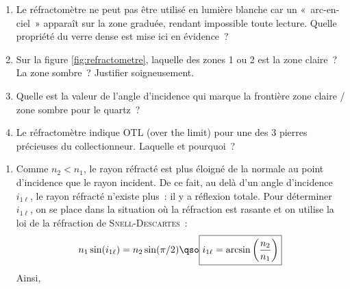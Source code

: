 \documentclass[a4paper, 10pt, garamond, oneside]{book}
\begin{document}
{	\begin{enumerate}
		\item Le réfractomètre ne peut pas être utilisé en lumière blanche car un
		      «~arc-en-ciel~» apparaît sur la zone graduée, rendant impossible toute
		      lecture. Quelle propriété du verre dense est mise ici en évidence~?
		\item Sur la figure \ref{fig:refractometre}, laquelle des zones 1 ou  2 est
		      la zone claire~? La zone sombre~? Justifier soigneusement.
		\item Quelle est la valeur de l'angle d'incidence qui marque la frontière
		      zone claire / zone sombre pour le quartz~?
		\item Le réfractomètre indique OTL (over the limit) pour une des 3 pierres
		      précieuses du collectionneur. Laquelle et pourquoi~?
	\end{enumerate}
}{
	\begin{enumerate}
		\item Comme $n_2<n_1$, le rayon réfracté est plus éloigné de la normale au
		      point d'incidence que le rayon incident. De ce fait, au delà d'un
		      angle d'incidence $i_{1\ell}$, le rayon réfracté n'existe plus~: il y
		      a réflexion totale. Pour déterminer $i_{1\ell}$, on se place dans la
		      situation où la réfraction est rasante et on utilise la loi de la
		      réfraction de \textsc{Snell-Descartes}~:
		      \[
			      n_1\sin(i_{1\ell})=n_2\sin(\pi/2)
			      \qso
			      \boxed{i_{1\ell}=\arcsin\left(\frac{n_2}{n_1}\right)}
		      \]
		      Ainsi, %


\end{enumerate}}
\end{document}
